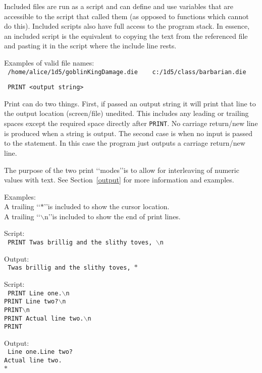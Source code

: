 Included files are run as a script and can define and use variables that are
accessible to the script that called them (as opposed to functions which
cannot do this). Included scripts also have full access to the program stack.
In essence, an included script is the equivalent to copying the text from the
referenced file and pasting it in the script where the include line rests.

\noindent Examples of valid file names:\\
\texttt{%
/home/alice/1d5/goblinKingDamage.die \ \ \ c:/1d5/class/barbarian.die
}

\breakline

\noindent\texttt{%
PRINT <output string>}

Print can do two things. First, if passed an output string it will print that
line to the output location (screen/file) unedited. This includes any leading
or trailing spaces except the required space directly after \texttt{PRINT}. No
carriage return/new line is produced when a string is output.
The second case is when no input is passed to the statement. In this case the
program just outputs a carriage return/new line.

The purpose of the two print \lq\lq modes\rq\rq is to allow for interleaving of
numeric values with text. See Section~\ref{output} for more information and
examples.

\noindent Examples:\\
A trailing \lq\lq$\ast$\rq\rq is included to show the cursor location.\\
A trailing \lq\lq$\backslash$n\rq\rq is included to show the end of print lines.

\noindent Script:\\
\texttt{%
PRINT Twas brillig and the slithy toves, $\backslash$n
}

\noindent Output:\\
\texttt{%
Twas brillig and the slithy toves, $\ast$
}

\noindent Script:\\
\texttt{%
PRINT Line one.$\backslash$n\\
PRINT Line two?$\backslash$n\\
PRINT$\backslash$n\\
PRINT Actual line two.$\backslash$n\\
PRINT
}

\noindent Output:\\
\texttt{%
Line one.Line two?\\
Actual line two.\\
$\ast$
}

